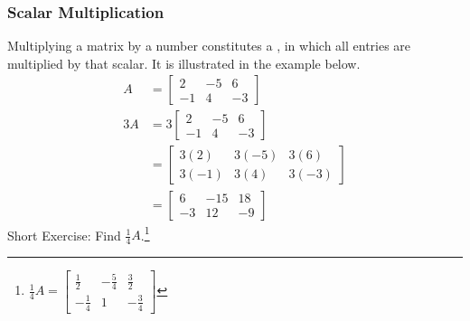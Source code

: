 \subsubsection{Scalar Multiplication} Multiplying a matrix by a number constitutes a , in which all entries are multiplied by that scalar. It is illustrated in the example below.
\begin{align*}
A &= 
\begin{bmatrix}
2 & -5 & 6 \\
-1 & 4 & -3
\end{bmatrix} \\
3A &= 3
\begin{bmatrix}
2 & -5 & 6 \\
-1 & 4 & -3
\end{bmatrix} \\
&=
\begin{bmatrix}
3(2) & 3(-5) & 3(6) \\
3(-1) & 3(4) & 3(-3)
\end{bmatrix} \\
&=
\begin{bmatrix}
6 & -15 & 18 \\
-3 & 12 & -9
\end{bmatrix}
\end{align*}
Short Exercise: Find $\frac{1}{4}A$.\footnote{$\frac{1}{4}A = \begin{bmatrix}
\frac{1}{2} & -\frac{5}{4} & \frac{3}{2} \\
-\frac{1}{4} & 1 & -\frac{3}{4}
\end{bmatrix}$}

